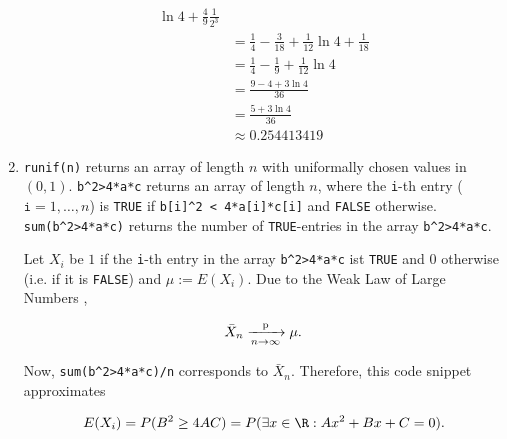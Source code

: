 \begin{solution}
\begin{enumerate}[label = (\alph*)]
\begin{align*}
        \ln 4
        +
        \frac{4}{9}
        \frac{1}{2^3} \\
        & =
        \frac{1}{4}
        -
        \frac{3}{18}
        +
        \frac{1}{12}
        \ln 4
        +
        \frac{1}{18} \\
        & =
        \frac{1}{4}
        -
        \frac{1}{9}
        +
        \frac{1}{12}
        \ln 4 \\
        & =
        \frac{9 - 4 + 3 \ln 4}{36} \\
        & =
        \frac{5 + 3 \ln 4}{36} \\
        & \approx
        0.254413419
    \end{align*}
    
    \item \verb|runif(n)| returns an array of length $n$ with uniformally chosen values in $(0, 1)$.
    \verb|b^2>4*a*c| returns an array of length $n$, where the \texttt{i}-th entry ($\texttt{i} = 1, \dots, n$) is \texttt{TRUE} if \verb|b[i]^2 < 4*a[i]*c[i]| and \texttt{FALSE} otherwise.
    \verb|sum(b^2>4*a*c)| returns the number of \texttt{TRUE}-entries in the array \verb|b^2>4*a*c|.
    
    Let $X_i$ be $1$ if the \texttt{i}-th entry in the array \verb|b^2>4*a*c| ist \texttt{TRUE} and $0$ otherwise (i.e. if it is \texttt{FALSE}) and $\mu := E(X_i)$.
    Due to the Weak Law of Large Numbers \cite[Lecture 4, Slide 52]{EStat},
    
    \begin{align*}
        \bar X_n \xrightarrow[n \to \infty]{\text p} \mu.
    \end{align*}
    
    Now, \verb|sum(b^2>4*a*c)/n| corresponds to $\bar X_n$.
    Therefore, this code snippet approximates
    
    \begin{align*}
        E(X_i)
        =
        P(B^2 \geq 4 A C)
        =
        P(\exists x \in \R: A x^2 + B x + C = 0).
    \end{align*}

\end{enumerate}

\end{solution}

